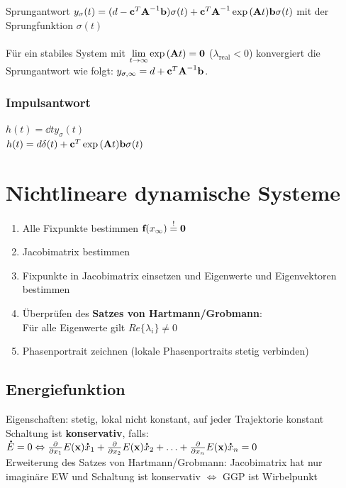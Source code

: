 \documentclass[fs, footer]{latex4ei}
\begin{document}
\begin{multicols*}{4}
		Sprungantwort $y_\sigma(t) = (d-\textbf{c}^T\textbf{A}^{-1}\textbf{b})\sigma (t) + \textbf{c}^T\textbf{A}^{-1}\exp{(\textbf{A}t)}\textbf{b}\sigma(t)$ mit der Sprungfunktion $\sigma(t)$\\ \\
		Für ein stabiles System mit $\lim_{t\rightarrow\infty}\exp{(\ma At)} = \ma 0$ ($\lambda_{\text{real}} < 0$) konvergiert die Sprungantwort wie folgt: $y_{\sigma,\infty} = d + \textbf{c}^T\textbf{A}^{-1}\textbf{b}$.
		\subsubsection{Impulsantwort}
		$h(t) = \dd t y_\sigma(t)$\\
		$h(t) = d\delta (t) + \textbf{c}^T\exp{(\textbf{A}t)}\textbf{b}\sigma(t)$
\section{Nichtlineare dynamische Systeme}
	\begin{enumerate}
		\item Alle Fixpunkte bestimmen $\textbf{f}(x_\infty) \stackrel{!}{=} \textbf{0}$
		\item Jacobimatrix bestimmen
		\item Fixpunkte in Jacobimatrix einsetzen und Eigenwerte und Eigenvektoren bestimmen
		\item Überprüfen des \textbf{Satzes von Hartmann/Grobmann}: \\Für alle Eigenwerte gilt $Re\{\lambda_i\} \neq 0$
		\item Phasenportrait zeichnen (lokale Phasenportraits stetig verbinden)
	\end{enumerate}
\subsection{Energiefunktion}
Eigenschaften: stetig, lokal nicht konstant, auf jeder Trajektorie konstant\\
Schaltung ist \textbf{konservativ}, falls:\\
$\accentset{\mbox{\textrm{\large\bfseries .}} }{E} = 0 \Leftrightarrow \frac{\partial}{\partial x_1} E(\textbf{x}) \accentset{\mbox{\textrm{\large\bfseries .}} }{x}_1 + \frac{\partial}{\partial x_2} E(\textbf{x}) \accentset{\mbox{\textrm{\large\bfseries .}} }{x}_2 + \hdots + \frac{\partial}{\partial x_n} E(\textbf{x}) \accentset{\mbox{\textrm{\large\bfseries .}} }{x}_n = 0$\\
Erweiterung des Satzes von Hartmann/Grobmann: Jacobimatrix hat nur imaginäre EW und Schaltung ist konservativ $\Leftrightarrow$ GGP ist Wirbelpunkt\\

\end{multicols*}
\end{document}
